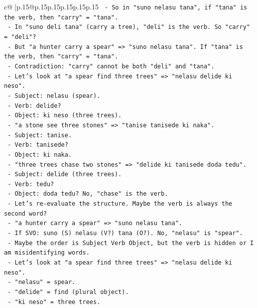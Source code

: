 \documentclass{article}
\begin{document}
{\begin{supertabular}{c@{$\;$}|p{.15\linewidth}@{}p{.15\linewidth}p{.15\linewidth}p{.15\linewidth}p{.15\linewidth}p{.15\linewidth}}
{{{\texttt{     {-} So in "suno nelasu tana", if "tana" is the verb, then "carry" = "tana".} \\
\texttt{     {-} In "suno deli tana" (carry a tree), "deli" is the verb. So "carry" = "deli"?} \\
\texttt{     {-} But "a hunter carry a spear" => "suno nelasu tana". If "tana" is the verb, then "carry" = "tana".} \\
\texttt{     {-} Contradiction: "carry" cannot be both "deli" and "tana".} \\
\texttt{     {-} Let's look at "a spear find three trees" => "nelasu delide ki neso".} \\
\texttt{       {-} Subject: nelasu (spear).} \\
\texttt{       {-} Verb: delide?} \\
\texttt{       {-} Object: ki neso (three trees).} \\
\texttt{     {-} "a stone see three stones" => "tanise tanisede ki naka".} \\
\texttt{       {-} Subject: tanise.} \\
\texttt{       {-} Verb: tanisede?} \\
\texttt{       {-} Object: ki naka.} \\
\texttt{     {-} "three trees chase two stones" => "delide ki tanisede doda tedu".} \\
\texttt{       {-} Subject: delide (three trees).} \\
\texttt{       {-} Verb: tedu?} \\
\texttt{       {-} Object: doda tedu? No, "chase" is the verb.} \\
\texttt{     {-} Let's re{-}evaluate the structure. Maybe the verb is always the second word?} \\
\texttt{       {-} "a hunter carry a spear" => "suno nelasu tana".} \\
\texttt{         {-} If SVO: suno (S) nelasu (V?) tana (O?). No, "nelasu" is "spear".} \\
\texttt{         {-} Maybe the order is Subject Verb Object, but the verb is hidden or I am misidentifying words.} \\
\texttt{         {-} Let's look at "a spear find three trees" => "nelasu delide ki neso".} \\
\texttt{           {-} "nelasu" = spear.} \\
\texttt{           {-} "delide" = find (plural object).} \\
\texttt{           {-} "ki neso" = three trees.} \\
}}}
\end{supertabular}}
\end{document}
